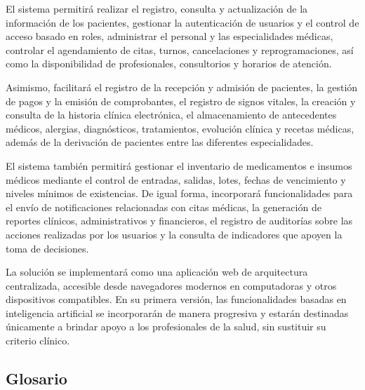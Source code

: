 \documentclass[11pt,a4paper]{article}
\begin{document}
	El sistema permitirá realizar el registro, consulta y actualización de la información de los pacientes, gestionar la autenticación de usuarios y el control de acceso basado en roles, administrar el personal y las especialidades médicas, controlar el agendamiento de citas, turnos, cancelaciones y reprogramaciones, así como la disponibilidad de profesionales, consultorios y horarios de atención.
	
	Asimismo, facilitará el registro de la recepción y admisión de pacientes, la gestión de pagos y la emisión de comprobantes, el registro de signos vitales, la creación y consulta de la historia clínica electrónica, el almacenamiento de antecedentes médicos, alergias, diagnósticos, tratamientos, evolución clínica y recetas médicas, además de la derivación de pacientes entre las diferentes especialidades.
	
	El sistema también permitirá gestionar el inventario de medicamentos e insumos médicos mediante el control de entradas, salidas, lotes, fechas de vencimiento y niveles mínimos de existencias. De igual forma, incorporará funcionalidades para el envío de notificaciones relacionadas con citas médicas, la generación de reportes clínicos, administrativos y financieros, el registro de auditorías sobre las acciones realizadas por los usuarios y la consulta de indicadores que apoyen la toma de decisiones.
	
	La solución se implementará como una aplicación web de arquitectura centralizada, accesible desde navegadores modernos en computadoras y otros dispositivos compatibles. En su primera versión, las funcionalidades basadas en inteligencia artificial se incorporarán de manera progresiva y estarán destinadas únicamente a brindar apoyo a los profesionales de la salud, sin sustituir su criterio clínico.
	
	\subsection{ Glosario}
	
	\label{subsec:glosario}
	
\end{document}
